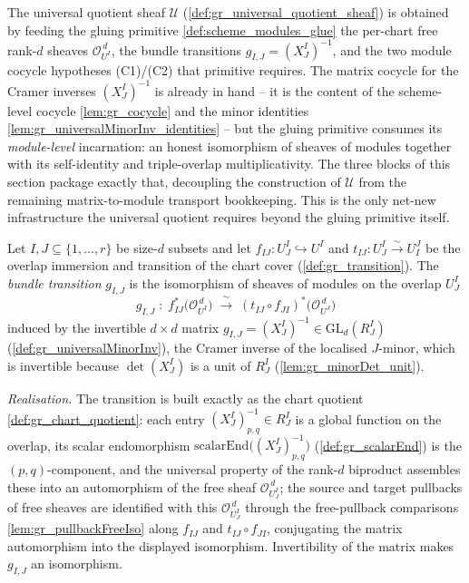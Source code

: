 The universal quotient sheaf \(\mathcal{U}\) (\cref{def:gr_universal_quotient_sheaf}) is
obtained by feeding the gluing primitive \cref{def:scheme_modules_glue} the per-chart free
rank-\(d\) sheaves \(\mathcal{O}_{U^I}^{\,d}\), the bundle transitions
\(g_{I,J} = (X^I_J)^{-1}\), and the two module cocycle hypotheses (C1)/(C2) that primitive
requires. The matrix cocycle for the Cramer inverses \((X^I_J)^{-1}\) is already in hand --
it is the content of the scheme-level cocycle \cref{lem:gr_cocycle} and the minor identities
\cref{lem:gr_universalMinorInv_identities} -- but the gluing primitive consumes its
\emph{module-level} incarnation: an honest isomorphism of sheaves of modules together with
its self-identity and triple-overlap multiplicativity. The three blocks of this section
package exactly that, decoupling the construction of \(\mathcal{U}\) from the remaining
matrix-to-module transport bookkeeping. This is the only net-new infrastructure the
universal quotient requires beyond the gluing primitive itself.


\begin{definition}\leanok
  \label{def:gr_bundleTransition}
  Let \(I, J \subseteq \{1,\dots,r\}\) be size-\(d\) subsets and let
  \(f_{IJ} : U^I_J \hookrightarrow U^I\) and \(t_{IJ} : U^I_J \xrightarrow{\sim} U^J_I\) be
  the overlap immersion and transition of the chart cover (\cref{def:gr_transition}). The
  \emph{bundle transition} \(g_{I,J}\) is the isomorphism of sheaves of modules on the
  overlap \(U^I_J\)
  \[
    g_{I,J} \;:\;
      f_{IJ}^{*}\bigl(\mathcal{O}_{U^I}^{\,d}\bigr)
      \;\xrightarrow{\ \sim\ }\;
      (t_{IJ} \circ f_{JI})^{*}\bigl(\mathcal{O}_{U^J}^{\,d}\bigr)
  \]
  induced by the invertible \(d \times d\) matrix
  \(g_{I,J} = (X^I_J)^{-1} \in \mathrm{GL}_d(R^I_J)\) (\cref{def:gr_universalMinorInv}),
  the Cramer inverse of the localised \(J\)-minor, which is invertible because
  \(\det(X^I_J)\) is a unit of \(R^I_J\) (\cref{lem:gr_minorDet_unit}).

  \emph{Realisation.} The transition is built exactly as the chart quotient
  \cref{def:gr_chart_quotient}: each entry \((X^I_J)^{-1}_{p,q} \in R^I_J\) is a global
  function on the overlap, its scalar endomorphism
  \(\mathrm{scalarEnd}\bigl((X^I_J)^{-1}_{p,q}\bigr)\) (\cref{def:gr_scalarEnd}) is the
  \((p,q)\)-component, and the universal property of the rank-\(d\) biproduct assembles
  these into an automorphism of the free sheaf \(\mathcal{O}_{U^I_J}^{\,d}\); the
  source and target pullbacks of free sheaves are identified with this
  \(\mathcal{O}_{U^I_J}^{\,d}\) through the free-pullback comparisons
  \cref{lem:gr_pullbackFreeIso} along \(f_{IJ}\) and \(t_{IJ} \circ f_{JI}\), conjugating
  the matrix automorphism into the displayed isomorphism. Invertibility of the matrix makes
  \(g_{I,J}\) an isomorphism.
\end{definition}


